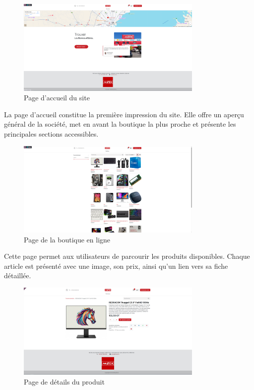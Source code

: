 \documentclass[12pt]{report}
\begin{document}
\begin{figure}[H]
    \centering
    \includegraphics[width=0.8\textwidth]{images/interfaces/page_acceuil.PNG}
    \caption{Page d'accueil du site}
    \label{fig:page_accueil}
\end{figure}

La page d’accueil constitue la première impression du site. Elle offre un aperçu général de la société, met en avant la boutique la plus proche et présente les principales sections accessibles.

\begin{figure}[H]
    \centering
    \includegraphics[width=0.8\textwidth]{images/interfaces/page_boutique.PNG}
    \caption{Page de la boutique en ligne}
    \label{fig:page_boutique}
\end{figure}

Cette page permet aux utilisateurs de parcourir les produits disponibles. Chaque article est présenté avec une image, son prix, ainsi qu’un lien vers sa fiche détaillée.

\begin{figure}[H]
    \centering
    \includegraphics[width=0.8\textwidth]{images/interfaces/page_produit_details.PNG}
    \caption{Page de détails du produit}
    \label{fig:page_details_produit}
\end{figure}
\end{document}
